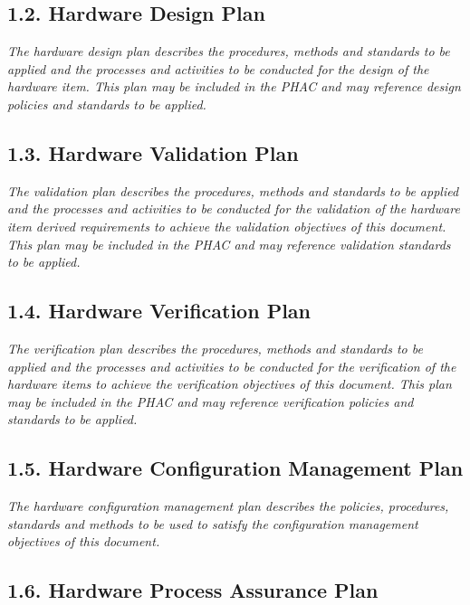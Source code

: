 \documentclass[]{article}
\begin{document}
\subsection{1.2. Hardware Design Plan}\label{hardware-design-plan}

\emph{The hardware design plan describes the procedures, methods and
standards to be applied and the processes and activities to be conducted
for the design of the hardware item. This plan may be included in the
PHAC and may reference design policies and standards to be applied.}

\subsection{1.3. Hardware Validation
Plan}\label{hardware-validation-plan}

\emph{The validation plan describes the procedures, methods and
standards to be applied and the processes and activities to be conducted
for the validation of the hardware item derived requirements to achieve
the validation objectives of this document. This plan may be included in
the PHAC and may reference validation standards to be applied.}

\subsection{1.4. Hardware Verification
Plan}\label{hardware-verification-plan}

\emph{The verification plan describes the procedures, methods and
standards to be applied and the processes and activities to be conducted
for the verification of the hardware items to achieve the verification
objectives of this document. This plan may be included in the PHAC and
may reference verification policies and standards to be applied.}

\subsection{1.5. Hardware Configuration Management
Plan}\label{hardware-configuration-management-plan}

\emph{The hardware configuration management plan describes the policies,
procedures, standards and methods to be used to satisfy the
configuration management objectives of this document.}

\subsection{1.6. Hardware Process Assurance
Plan}\label{hardware-process-assurance-plan}
\end{document}
